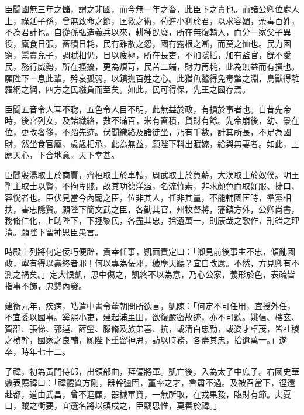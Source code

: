 \begin{pinyinscope}
 
 
 
 臣聞國無三年之儲，謂之非國，而今無一年之畜，此臣下之責也。而諸公卿位處人上，祿延子孫，曾無致命之節，匡救之術，苟進小利於君，以求容媚，荼毒百姓，不為君計也。自從孫弘造義兵以來，耕種旣廢，所在無復輸入，而分一家父子異役，廩食日張，畜積日耗，民有離散之怨，國有露根之漸，而莫之恤也。民力困窮，鬻賣兒子，調賦相仍，日以疲極，所在長吏，不加隱括，加有監官，旣不愛民，務行威勢，所在搔擾，更為煩苛，民苦二端，財力再耗，此為無益而有損也。願陛下一息此輩，矜哀孤弱，以鎮撫百姓之心。此猶魚龞得免毒螫之淵，鳥獸得離羅網之綱，四方之民繈負而至矣。如此，民可得保，先王之國存焉。
 
 
 
 
 臣聞五音令人耳不聦，五色令人目不明，此無益於政，有損於事者也。自昔先帝時，後宮列女，及諸織絡，數不滿百，米有畜積，貨財有餘。先帝崩後，幼、景在位，更改奢侈，不蹈先迹。伏聞織絡及諸徒坐，乃有千數，計其所長，不足為國財，然坐食官廩，歲歲相承，此為無益，願陛下料出賦嫁，給與無妻者。如此，上應天心，下合地意，天下幸甚。
 
 
 
 
 臣聞殷湯取士於商賈，齊桓取士於車轅，周武取士於負薪，大漢取士於奴僕。明王聖主取士以賢，不拘卑賤，故其功德洋溢，名流竹素，非求顏色而取好服、捷口、容恱者也。臣伏見當今內寵之臣，位非其人，任非其量，不能輔國匡時，羣黨相扶，害忠隱賢。願陛下簡文武之臣，各勤其官，州牧督將，藩鎮方外，公卿尚書，務脩仁化，上助陛下，下拯黎民，各盡其忠，拾遺萬一，則康哉之歌作，刑錯之理清。願陛下留神思臣愚言。
 
 
 
 
 時殿上列將何定佞巧便辟，貴幸任事，凱面責定曰：「卿見前後事主不忠，傾亂國政，寧有得以壽終者邪！何以專為佞邪，穢塵天聽？宜自改厲。不然，方見卿有不測之禍矣。」定大恨凱，思中傷之，凱終不以為意，乃心公家，義形於色，表疏皆指事不飾，忠懇內發。
 
 
 
 
 建衡元年，疾病，皓遣中書令董朝問所欲言，凱陳：「何定不可任用，宜授外任，不宜委以國事。奚熙小吏，建起浦里田，欲復嚴密故迹，亦不可聽。姚信、樓玄、賀卲、張悌、郭逴、薛瑩、滕脩及族弟喜、抗，或清白忠勤，或姿才卓茂，皆社稷之楨幹，國家之良輔，願陛下重留神思，訪以時務，各盡其忠，拾遺萬一。」遂卒，時年七十二。
 
 
 
 
 子禕，初為黃門侍郎，出領部曲，拜偏將軍。凱亡後，入為太子中庶子。右國史華覈表薦禕曰：「禕體質方剛，器幹彊固，董率之才，魯肅不過。及被召當下，徑還赴都，道由武昌，曾不迴顧，器械軍資，一無所取，在戎果毅，臨財有節。夫夏口，賊之衝要，宜選名將以鎮戍之，臣竊思惟，莫善於禕。」
 
 
 

\end{pinyinscope}
